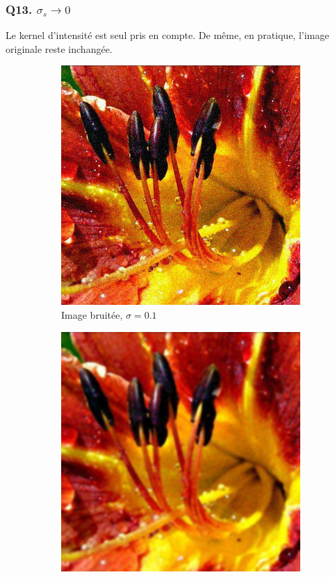 \documentclass{article}
\begin{document}
\subsubsection*{Q13. $\sigma_s \rightarrow 0 $}
Le kernel d'intensité est seul pris en compte. De même, en pratique, l'image originale reste inchangée.

\begin{figure}
    \centering
    \begin{subfigure}[b]{0.3\textwidth}
        \includegraphics[width=\textwidth]{flowers_noisy.png}
        \caption{Image bruitée, $\sigma=0.1$}
    \end{subfigure}
    \begin{subfigure}[b]{0.3\textwidth}
        \includegraphics[width=\textwidth]{bilateral10_1.png}

\end{subfigure}
\end{figure}
\end{document}
